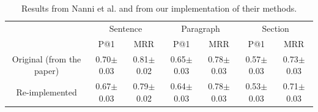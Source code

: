\begin{table}[t]
\caption{Results from Nanni et al.\cite{nanni2018entity} and from our implementation of their methods.}
\label{tab:Reproducible-results}
\begin{tabular}{|c|c|c|c|c|c|c|}
\hline
                          &               &               &                &               &               &               \\ \hline
                          & \multicolumn{2}{c|}{Sentence} & \multicolumn{2}{c|}{Paragraph} & \multicolumn{2}{c|}{Section}  \\ \hline
                          & P@1           & MRR           & P@1            & MRR           & P@1           & MRR           \\ \hline
Original (from the paper) & 0.70$\pm$0.03 & 0.81$\pm$0.02 & 0.65$\pm$0.03  & 0.78$\pm$0.03 & 0.57$\pm$0.03 & 0.73$\pm$0.03 \\ \hline
Re-implemented            & 0.67$\pm$0.03 & 0.79$\pm$0.02 & 0.64$\pm$0.03  & 0.78$\pm$0.03 & 0.53$\pm$0.03 & 0.71$\pm$0.03 \\ \hline
\end{tabular}
\end{table}

